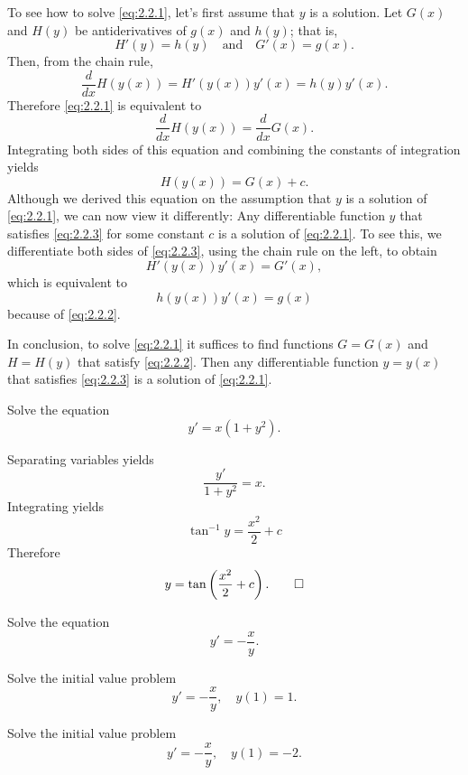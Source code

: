 To see how to solve \eqref{eq:2.2.1}, let's first assume that $y$
is a solution.
Let  $G(x)$ and $H(y)$ be antiderivatives of $g(x)$
and $h(y)$; that is,
\begin{equation}\label{eq:2.2.2}
H'(y)=h(y)\quad\text{and}\quad G'(x)=g(x).
\end{equation}
Then, from the chain rule,
\[
\frac{d}{dx}H(y(x))=H'(y(x))y'(x)=h(y)y'(x).
\]
Therefore \eqref{eq:2.2.1} is equivalent to
\[
\frac{d}{dx}H(y(x))=\frac{d}{dx}G(x).
\]
Integrating both sides of this equation and combining the constants of
integration yields
\begin{equation} \label{eq:2.2.3}
H(y(x))=G(x)+c.
\end{equation}
Although we derived this equation on the assumption that $y$
is a solution of \eqref{eq:2.2.1}, we can now view it differently:
Any differentiable function $y$ that satisfies \eqref{eq:2.2.3}
for some constant $c$ is a solution of \eqref{eq:2.2.1}. To see this, we
differentiate both sides of \eqref{eq:2.2.3}, using the chain rule on the
left, to obtain
\[
H'(y(x))y'(x)=G'(x),
\]
which is equivalent to
\[
h(y(x))y'(x)=g(x)
\]
because of \eqref{eq:2.2.2}.

In conclusion, to solve \eqref{eq:2.2.1} it suffices to find
functions $G=G(x)$ and $H=H(y)$ that satisfy \eqref{eq:2.2.2}.
Then any differentiable function  $y=y(x)$  that satisfies
\eqref{eq:2.2.3} is a solution of \eqref{eq:2.2.1}.

\begin{example}\label{example:2.2.1}
Solve the equation
\[
y'=x(1+y^2).
\]
\end{example}


\begin{solution}
Separating variables yields
\[
\frac{y'}{1+y^2}=x.
\]
Integrating yields
\[
\tan^{-1}y=\frac{x^2}{2}+c
\]
Therefore
\[
y=\tan\left(\frac{x^2}{2}+c\right).\qedhere
\]
\end{solution}

\begin{example}\label{example:2.2.2}
\begin{alist}
\item %
Solve the equation
\begin{equation} \label{eq:2.2.4}
y'=-\frac{x}{y}.
\end{equation}

\item %
Solve the initial value problem
\begin{equation} \label{eq:2.2.5}
y'=-\frac{x}{y}, \quad y(1)=1.
\end{equation}

\item %
Solve the initial value problem
\begin{equation} \label{eq:2.2.6}
y'=-\frac{x}{y}, \quad y(1)=-2.
\end{equation}
\end{alist}
\end{example}

